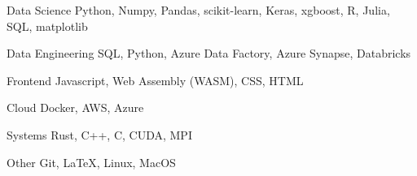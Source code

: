 
\begin{cvskills}

\cvskill
  {Data Science} %
  {Python, Numpy, Pandas, scikit-learn, Keras, xgboost, R, Julia, SQL, matplotlib}

\cvskill
  {Data Engineering} %
  {SQL, Python, Azure Data Factory, Azure Synapse, Databricks}


\cvskill
  {Frontend} %
  {Javascript, Web Assembly (WASM), CSS, HTML}

\cvskill
  {Cloud} %
  {Docker, AWS, Azure}

\cvskill
  {Systems} %
  {Rust, C++, C, CUDA, MPI}

\cvskill
  {Other} %
  {Git, \LaTeX, Linux, MacOS}

\end{cvskills}
